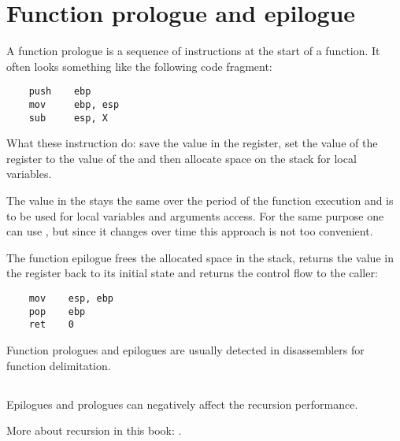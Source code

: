 \section{Function prologue and epilogue}
\label{sec:prologepilog}

A function prologue is a sequence of instructions at the start of a function. It often looks something like the following code fragment:

\begin{lstlisting}
    push    ebp
    mov     ebp, esp
    sub     esp, X
\end{lstlisting}

What these instruction do: save the value in the \EBP register,
set the value of the \EBP register to the value of the \ESP and then allocate space on the stack 
for local variables.

The value in the \EBP stays the same over the period of the function execution and is to be used for local variables and 
arguments access. 
For the same purpose one can use \ESP, but since it changes over time this approach is not too convenient.

The function epilogue frees the allocated space in the stack, returns the value in the \EBP register back to its initial state 
and returns the control flow to the \gls{caller}:

\begin{lstlisting}
    mov    esp, ebp
    pop    ebp
    ret    0
\end{lstlisting}

Function prologues and epilogues are usually detected in disassemblers for function delimitation.

\subsection{\Recursion}

\myindex{\Recursion}
Epilogues and prologues can negatively affect the recursion performance.

More about recursion in this book: .

